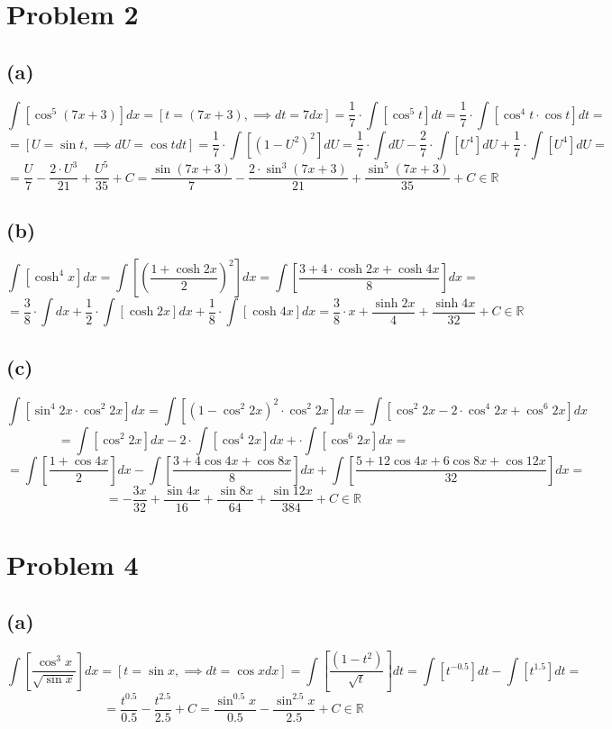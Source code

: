\documentclass{article}
\begin{document}
\section*{Problem 2}
\subsection*{(a)}
$$\int\left[\cos^5{(7x + 3)}\right]dx = \left[t = (7x + 3),\implies dt = 7dx\right] = \frac{1}{7}\cdot\int\left[\cos^5{t}\right]dt = \frac{1}{7}\cdot\int\left[\cos^4{t}\cdot\cos{t}\right]dt = $$
$$ = \left[U = \sin{t},\implies dU = \cos{t}dt\right] = \frac{1}{7}\cdot\int\left[(1 - U^2)^2\right]dU = \frac{1}{7}\cdot\int dU - \frac{2}{7}\cdot\int\left[U^4\right]dU + \frac{1}{7}\cdot\int\left[U^4\right]dU = $$
$$ = \frac{U}{7} - \frac{2\cdot U^3}{21} + \frac{U^5}{35} + C = \frac{\sin{(7x + 3)}}{7} - \frac{2\cdot\sin^3{(7x + 3)}}{21} + \frac{\sin^5{(7x + 3)}}{35} + C\in\mathbb{R}$$
\subsection*{(b)}
$$\int\left[\cosh^4{x}\right]dx = \int\left[\left(\frac{1 + \cosh{2x}}{2}\right)^2\right]dx = \int\left[\frac{3 + 4\cdot\cosh{2x} + \cosh{4x}}{8}\right]dx =$$
$$ = \frac{3}{8}\cdot\int dx + \frac{1}{2}\cdot\int\left[\cosh{2x}\right]dx + \frac{1}{8}\cdot\int\left[\cosh{4x}\right]dx = \frac{3}{8}\cdot x + \frac{\sinh{2x}}{4} + \frac{\sinh{4x}}{32} + C\in\mathbb{R}$$
\subsection*{(c)}
$$\int\left[\sin^4{2x}\cdot\cos^2{2x}\right]dx = \int\left[(1 - \cos^2{2x})^2\cdot\cos^2{2x}\right]dx = \int\left[\cos^2{2x} - 2\cdot\cos^4{2x} + \cos^6{2x}\right]dx$$
$$ = \int\left[\cos^2{2x}\right]dx - 2\cdot\int\left[\cos^4{2x}\right]dx + \cdot\int\left[\cos^6{2x}\right]dx = $$
$$ = \int\left[\frac{1 + \cos{4x}}{2}\right]dx - \int\left[\frac{3 + 4\cos{4x} + \cos{8x}}{8}\right]dx + \int\left[\frac{5 + 12\cos{4x} + 6\cos{8x} + \cos{12x}}{32}\right]dx = $$
$$ = -\frac{3x}{32} + \frac{\sin{4x}}{16} + \frac{\sin{8x}}{64} + \frac{\sin{12x}}{384} + C\in\mathbb{R}$$
\newpage\section*{Problem 4}
\subsection*{(a)}
$$\int\left[\frac{\cos^3{x}}{\sqrt{\sin{x}}}\right]dx = \left[t = \sin{x},\implies dt = \cos{x}dx\right] = \int\left[\frac{(1 - t^2)}{\sqrt{t}}\right]dt = \int\left[t^{-0.5}\right]dt - \int\left[t^{1.5}\right]dt = $$
$$ = \frac{t^{0.5}}{0.5} - \frac{t^{2.5}}{2.5} + C = \frac{\sin^{0.5}{x}}{0.5} - \frac{\sin^{2.5}{x}}{2.5} + C\in\mathbb{R}$$
\end{document}
